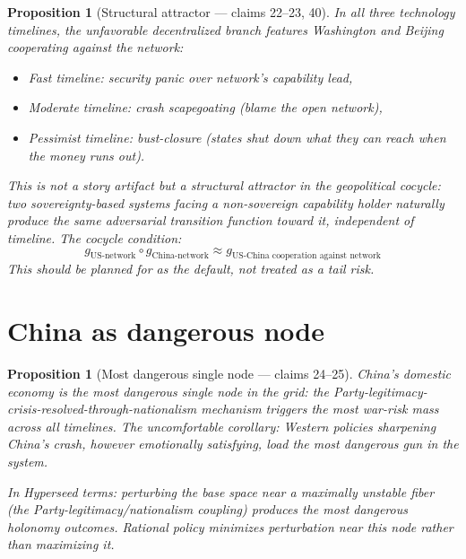 \documentclass[11pt,a4paper]{article}
\newtheorem{proposition}[definition]{Proposition}
\begin{document}
\begin{proposition}[Structural attractor --- claims 22--23, 40]
\label{prop:g2}
In all three technology timelines, the unfavorable decentralized branch
features Washington and Beijing cooperating against the network:
\begin{itemize}
\item Fast timeline: security panic over network's capability lead,
\item Moderate timeline: crash scapegoating (blame the open network),
\item Pessimist timeline: bust-closure (states shut down what they
  can reach when the money runs out).
\end{itemize}
This is not a story artifact but a \emph{structural attractor in the
geopolitical cocycle}: two sovereignty-based systems facing a
non-sovereign capability holder naturally produce the same adversarial
transition function toward it, independent of timeline. The cocycle
condition:
\[
  g_{\text{US-network}} \circ g_{\text{China-network}} \approx
  g_{\text{US-China cooperation against network}}
\]
This should be planned for as the default, not treated as a tail risk.
\end{proposition}

\section{China as dangerous node}
\label{sec:china}

\begin{proposition}[Most dangerous single node --- claims 24--25]
\label{prop:china}
China's domestic economy is the most dangerous single node in the grid:
the Party-legitimacy-crisis-resolved-through-nationalism mechanism
triggers the most war-risk mass across all timelines. The uncomfortable
corollary: Western policies sharpening China's crash, however emotionally
satisfying, load the most dangerous gun in the system.

In Hyperseed terms: perturbing the base space near a maximally unstable
fiber (the Party-legitimacy/nationalism coupling) produces the most
dangerous holonomy outcomes. Rational policy minimizes perturbation
near this node rather than maximizing it.
\end{proposition}

\end{document}
